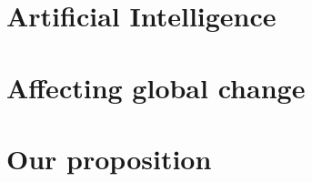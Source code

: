 \documentclass[10pt, a5paper]{book}
\begin{document}
\chapter{Artificial Intelligence}


\chapter{Affecting global change}


\chapter{Our proposition}



\end{document}
